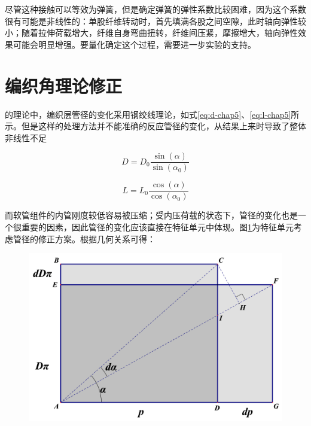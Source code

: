 尽管这种接触可以等效为弹簧，但是确定弹簧的弹性系数比较困难，因为这个系数很有可能是非线性的：单股纤维转动时，首先填满各股之间空隙，此时轴向弹性较小；随着拉伸荷载增大，纤维自身弯曲扭转，纤维间压紧，摩擦增大，轴向弹性效果可能会明显增强。要量化确定这个过程，需要进一步实验的支持。



\section{编织角理论修正}
\ha 的理论中，编织层管径的变化采用钢绞线理论，如式\ref{eq:d-chap5}、\ref{eq:l-chap5}所示。但是这样的处理方法并不能准确的反应管径的变化，从结果上来时导致了整体非线性不足

\begin{equation}
\label{eq:d-chap5}
D = {D_0}\frac{{\sin \left( \alpha  \right)}}{{\sin \left( {{\alpha _0}} \right)}}
\end{equation}

\begin{equation}
\label{eq:l-chap5}
L = {L_0}\frac{{\cos \left( \alpha  \right)}}{{\cos \left( {{\alpha _0}} \right)}}
\end{equation}




而软管组件的内管刚度较低容易被压缩；受内压荷载的状态下，管径的变化也是一个很重要的因素，因此管径的变化应该直接在特征单元中体现。图\ref{fig:unit-cell-3}为特征单元考虑管径的修正方案。根据几何关系可得：

\begin{figure}[!htb]
\centering
\includegraphics[height=0.2\textheight]{figure/chap5/unit-cell-3}
\label{fig:unit-cell-3}
\end{figure}

